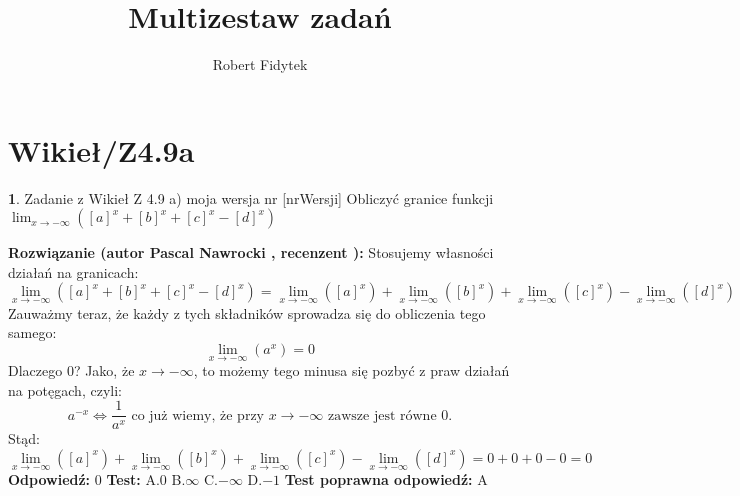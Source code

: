 \documentclass[12pt, a4paper]{article}
\title{Multizestaw zadań}
\author{Robert Fidytek}
\date{}
\theoremstyle{definition} %
\newtheorem{zad}{}
\newcommand{\kategoria}[1]{\section{#1}} %
\newcommand{\zadStart}[1]{\begin{zad}#1\newline} %
\newcommand{\zadStop}{\end{zad}}   %
\newcommand{\rozwStart}[2]{\noindent \textbf{Rozwiązanie (autor #1 , recenzent #2): }\newline} %
\newcommand{\rozwStop}{\newline}                                            %
\newcommand{\odpStart}{\noindent \textbf{Odpowiedź:}\newline}    %
\newcommand{\odpStop}{\newline}                                             %
\newcommand{\testStart}{\noindent \textbf{Test:}\newline} %
\newcommand{\testStop}{\newline} %
\newcommand{\kluczStart}{\noindent \textbf{Test poprawna odpowiedź:}\newline} %
\newcommand{\kluczStop}{\newline} %
\begin{document}
\maketitle


\kategoria{Wikieł/Z4.9a}
\zadStart{Zadanie z Wikieł Z 4.9 a) moja wersja nr [nrWersji]}
Obliczyć granice funkcji $\displaystyle{\lim_{x \to -\infty}}([a]^x+[b]^x+[c]^x-[d]^x)$
\zadStop
\rozwStart{Pascal Nawrocki}{}
Stosujemy własności działań na granicach:
$$\displaystyle{\lim_{x \to -\infty}}([a]^x+[b]^x+[c]^x-[d]^x)=\displaystyle{\lim_{x \to -\infty}}([a]^x)+\displaystyle{\lim_{x \to -\infty}}([b]^x)+\displaystyle{\lim_{x \to -\infty}}([c]^x)-\displaystyle{\lim_{x \to -\infty}}([d]^x)$$
Zauważmy teraz, że każdy z tych składników sprowadza się do obliczenia tego samego:
$$\displaystyle{\lim_{x \to -\infty}}(a^x)=0$$
Dlaczego 0? Jako, że $x \to -\infty$, to możemy tego minusa się pozbyć z praw działań na potęgach, czyli:
$$a^{-x}\Leftrightarrow\frac{1}{a^x} \text{ co już wiemy, że przy $x \to -\infty$ zawsze jest równe }0\text{.}$$
Stąd:
$$\displaystyle{\lim_{x \to -\infty}}([a]^x)+\displaystyle{\lim_{x \to -\infty}}([b]^x)+\displaystyle{\lim_{x \to -\infty}}([c]^x)-\displaystyle{\lim_{x \to -\infty}}([d]^x)=0+0+0-0=0$$
\rozwStop
\odpStart
$0$
\odpStop
\testStart
A.$0$
B.$\infty$
C.$-\infty$
D.$-1$
\testStop
\kluczStart
A
\kluczStop
\end{document}
